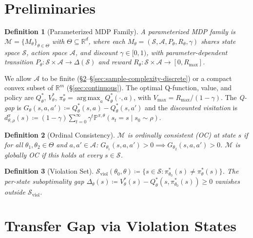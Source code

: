 \documentclass{article}
\newtheorem{definition}{Definition}
\newcommand{\R}{\mathbb{R}}
\newcommand{\Prob}{\mathbb{P}}
\newcommand{\cS}{\mathcal{S}}
\newcommand{\cA}{\mathcal{A}}
\newcommand{\cM}{\mathcal{M}}
\newcommand{\Sviol}{\mathcal{S}_{\mathrm{viol}}}
\newcommand{\Rmax}{R_{\max}}
\newcommand{\Vmax}{V_{\max}}
\DeclareMathOperator*{\argmax}{arg\,max}
\begin{document}
\section{Preliminaries}
\label{sec:prelim}

\begin{definition}[Parameterized MDP Family]
\label{def:param-mdp}
A \emph{parameterized MDP family} is $\cM = \{M_\theta\}_{\theta \in \Theta}$ with $\Theta \subseteq \R^d$, where each $M_\theta = (\cS, \cA, P_\theta, R_\theta, \gamma)$ shares state space $\cS$, action space $\cA$, and discount $\gamma \in [0,1)$, with parameter-dependent transition $P_\theta : \cS \times \cA \to \Delta(\cS)$ and reward $R_\theta : \cS \times \cA \to [0, \Rmax]$.
\end{definition}

We allow $\cA$ to be finite (\S\ref{sec:transfer-bound}--\S\ref{sec:sample-complexity-discrete}) or a compact convex subset of $\R^m$ (\S\ref{sec:continuous}). The optimal Q-function, value, and policy are $Q^*_\theta$, $V^*_\theta$, $\pi^*_\theta = \argmax_a Q^*_\theta(\cdot, a)$, with $\Vmax = \Rmax/(1-\gamma)$. The \emph{Q-gap} is $G_\theta(s,a,a') \coloneqq Q^*_\theta(s,a) - Q^*_\theta(s,a')$ and the \emph{discounted visitation} is $d^\pi_{\theta,\rho}(s) \coloneqq (1-\gamma)\sum_{t=0}^{\infty}\gamma^t \Prob^{\pi,\theta}(s_t = s \mid s_0 \sim \rho)$.

\begin{definition}[Ordinal Consistency]
\label{def:oc}
$\cM$ is \emph{ordinally consistent} (OC) at state $s$ if for all $\theta_1, \theta_2 \in \Theta$ and $a, a' \in \cA$:
$G_{\theta_1}(s,a,a') > 0 \implies G_{\theta_2}(s,a,a') > 0$.
$\cM$ is \emph{globally OC} if this holds at every $s \in \cS$.
\end{definition}

\begin{definition}[Violation Set]
\label{def:viol}
$\Sviol(\theta_0,\theta) \coloneqq \{s \in \cS : \pi^*_{\theta_0}(s) \neq \pi^*_{\theta}(s)\}$. The per-state suboptimality gap $\Delta_{\theta}(s) \coloneqq V^*_{\theta}(s) - Q^*_{\theta}(s, \pi^*_{\theta_0}(s)) \geq 0$ vanishes outside $\Sviol$.
\end{definition}

\section{Transfer Gap via Violation States}
\label{sec:transfer-bound}
\end{document}
